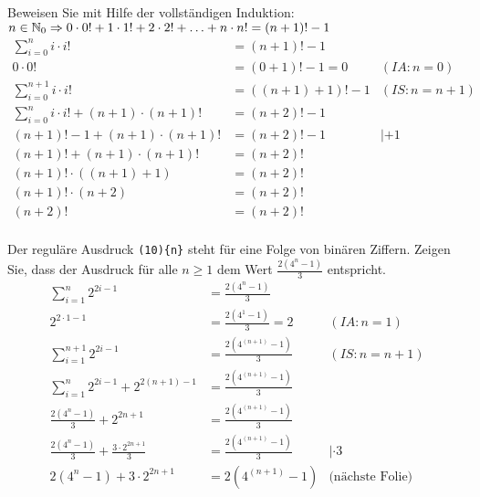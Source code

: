 \begin{card}
  Beweisen Sie mit Hilfe der vollständigen Induktion:\\
  $n \in \mathbb{N}_0 \Rightarrow 0 \cdot 0! + 1 \cdot 1! + 2 \cdot 2! + \ldots + n \cdot n! = (n+1)!-1$
  \hr
  \begin{align*}
    \sum\limits_{i=0}^{n} i \cdot i! &= (n+1)!-1 & \\
    0 \cdot 0! &= (0+1)!-1 = 0 & (IA: n=0) \\
    \sum\limits_{i=0}^{n+1} i \cdot i! &= ((n+1)+1)!-1 & (IS: n=n+1) \\
    \sum\limits_{i=0}^{n} i \cdot i! + (n+1) \cdot (n+1)! &= (n+2)!-1 & \\
    (n+1)! - 1 + (n+1) \cdot (n+1)! &= (n+2)!-1 & |+1 \\
    (n+1)! + (n+1) \cdot (n+1)! &= (n+2)! & \\
    (n+1)! \cdot ((n+1)+1) &= (n+2)! & \\
    (n+1)! \cdot (n+2) &= (n+2)! & \\
    (n+2)! &= (n+2)! & \\
  \end{align*}
\end{card}

\begin{card}
  Der reguläre Ausdruck \texttt{(10)\{n\}} steht für eine Folge von binären Ziffern. Zeigen Sie, dass der Ausdruck für alle
  $n \geq 1$ dem Wert $\frac{2(4^n - 1)}{3}$ entspricht.
  \hr
  \begin{align*}
    \sum\limits_{i=1}^{n} 2^{2i-1} &= \frac{2(4^n - 1)}{3} & \\
    2^{2 \cdot 1 - 1} &= \frac{2(4^1 - 1)}{3} = 2 & (IA: n=1) \\
    \sum\limits_{i=1}^{n+1} 2^{2i-1} &= \frac{2(4^{(n+1)} - 1)}{3} & (IS: n=n+1) \\
    \sum\limits_{i=1}^{n} 2^{2i-1} + 2^{2(n+1) - 1} &= \frac{2(4^{(n+1)} - 1)}{3} & \\
    \frac{2(4^{n} - 1)}{3} + 2^{2n+1} &= \frac{2(4^{(n+1)} - 1)}{3} & \\
    \frac{2(4^{n} - 1)}{3} + \frac{3 \cdot 2^{2n+1}}{3} &= \frac{2(4^{(n+1)} - 1)}{3} & |\cdot 3 \\
    2(4^{n} - 1) + 3 \cdot 2^{2n+1} &= 2(4^{(n+1)} - 1) & \text{(nächste Folie)} \\
  \end{align*}
\end{card}

